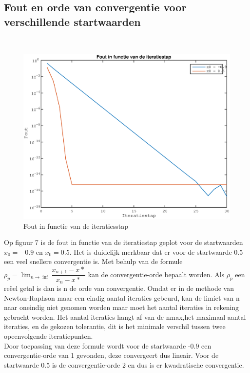 \documentclass{article}
\begin{document}
\subsection{Fout en orde van convergentie voor verschillende startwaarden}
\ \\
\begin{figure}[H]
\includegraphics[width=0.75\columnwidth]{figuur_3}
\caption{Fout in functie van de iteratiesstap} %
\end{figure}

Op figuur 7 is de fout in functie van de iteratiestap geplot voor de startwaarden $x_{0}=-0.9$ en $x_{0}=0.5$. Het is duidelijk merkbaar dat er voor de startwaarde 0.5 een veel snellere convergentie is. Met behulp van de formule $\rho_{p}=\lim_{n \rightarrow \inf } \dfrac{x_{n+1}-x{*}}{x_{n}-x{*}}$ kan de convergentie-orde bepaalt worden. Als $\rho_{p} $ een reëel getal is dan is n de orde van convergentie. Omdat er in de methode van Newton-Raphson maar een eindig aantal iteraties gebeurd, kan de limiet van n naar oneindig niet genomen worden maar moet het aantal iteraties in rekening gebracht worden. Het aantal iteraties hangt af van de nmax,het maximaal aantal iteraties, en de gekozen tolerantie, dit is het minimale verschil tussen twee opeenvolgende iteratiepunten. \\
Door toepassing van deze formule wordt voor de startwaarde -0.9 een convergentie-orde van 1 gevonden, deze convergeert dus lineair. Voor de startwaarde 0.5 is de convergentie-orde 2 en dus is er kwadratische convergentie.

\clearpage
\end{document}
